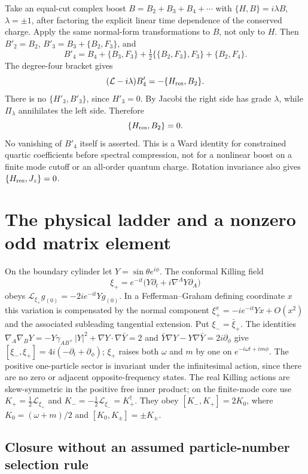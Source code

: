 \documentclass[11pt]{article}
\newcommand{\Lie}{\mathcal L}
\numberwithin{equation}{section}
\begin{document}
Take an equal-cut complex boost \(B=B_2+B_3+B_4+\cdots\)
with \(\{H,B\}=i\lambda B\), \(\lambda=\pm1\), after factoring
the explicit linear time dependence of the conserved charge.
Apply the same normal-form transformations to \(B\), not only
to \(H\). Then \(B'_2=B_2\), \(B'_3=B_3+\{B_2,F_3\}\), and
\[
 B'_4=B_4+\{B_3,F_3\}
       +\tfrac12\{\{B_2,F_3\},F_3\}+\{B_2,F_4\}.
\]
The degree-four bracket gives
\[
  (\mathcal L-i\lambda)B'_4=-\{H_{\rm res},B_2\}.
\]
There is no \(\{H'_3,B'_3\}\), since \(H'_3=0\).
By Jacobi the right side has grade \(\lambda\), while
\(\Pi_\lambda\) annihilates the left side. Therefore
\begin{equation}\label{eq:ward}
 \{H_{\rm res}, B_2\}=0 .
\end{equation}
No vanishing of \(B'_4\) itself is asserted. This is a
Ward identity for constrained quartic coefficients before
spectral compression, not for a nonlinear boost on a finite mode
cutoff or an all-order quantum charge. Rotation invariance also
gives \(\{H_{\rm res},J_z\}=0\).


\section{The physical ladder and a nonzero odd matrix element}\label{sec:matrix}

On the boundary cylinder let \(Y=\sin\theta e^{i\phi}\). The
conformal Killing field
\[
 \xi_+=e^{-it}\big(Y\partial_t+i\nabla^A Y\partial_A\big)
\]
obeys \(\Lie_{\xi_+}g_{(0)}=-2i e^{-it}Y g_{(0)}\).
In a Fefferman--Graham defining coordinate \(x\) this variation is
compensated by the normal component
\(\xi_+^x=-i e^{-it}Yx+O(x^2)\) and the associated subleading
tangential extension. Put \(\xi_-=\bar\xi_+\). The identities
\(\nabla_A\nabla_B Y=-Y\gamma_{AB}\),
\(|Y|^2+\nabla Y\cdot\nabla\bar Y=2\) and
\(\bar Y\nabla Y-Y\nabla\bar Y=2i\partial_\phi\)
give \([\xi_-,\xi_+]=4i(-\partial_t+\partial_\phi)\);
\(\xi_+\) raises both \(\omega\) and \(m\) by one on
\(e^{-i\omega t+im\phi}\). The positive one-particle sector
is invariant under the infinitesimal action, since there
are no zero or adjacent opposite-frequency states.
The real Killing actions are skew-symmetric in the positive
free inner product; on the finite-mode core use
\(K_+=\tfrac12\Lie_{\xi_+}\) and
\(K_-=-\tfrac12\Lie_{\xi_-}=K_+^\dagger\).
They obey \([K_-,K_+]=2K_0\), where
\(K_0=(\omega+m)/2\) and \([K_0,K_\pm]=\pm K_\pm\).

\subsection{Closure without an assumed particle-number selection rule}
\end{document}
